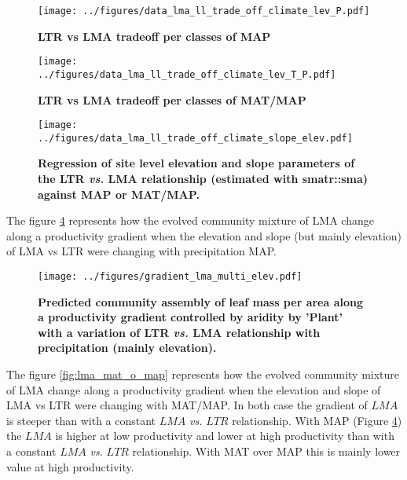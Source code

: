 \documentclass[a4paper,11pt]{article}
\begin{document}
\begin{figure}[ht]
\centering
\texttt{[image: ../figures/data\_lma\_ll\_trade\_off\_climate\_lev\_P.pdf]}
\caption{\textbf{LTR vs LMA tradeoff per classes of MAP}
\label{fig:MAP}}
\end{figure}


\begin{figure}[ht]
\centering
\texttt{[image: ../figures/data\_lma\_ll\_trade\_off\_climate\_lev\_T\_P.pdf]}
\caption{\textbf{LTR vs LMA tradeoff per classes of MAT/MAP}
\label{fig:MAT_MAP}}
\end{figure}


\begin{figure}[ht]
\centering
\texttt{[image: ../figures/data\_lma\_ll\_trade\_off\_climate\_slope\_elev.pdf]}
\caption{\textbf{Regression of site level elevation and slope parameters of the LTR \textit{vs.} LMA relationship (estimated with smatr::sma) against MAP or MAT/MAP. }
\label{fig:elev_slope}}
\end{figure}




The figure \ref{fig:lma_map} represents how the evolved community
mixture of LMA change along a productivity gradient when the elevation
and slope (but mainly elevation) of LMA vs LTR were changing with
precipitation MAP.

\begin{figure}[ht]
\centering
\texttt{[image: ../figures/gradient\_lma\_multi\_elev.pdf]}
\caption{\textbf{Predicted community assembly of leaf mass per area
    along a productivity gradient controlled by aridity by 'Plant'
    with a variation of LTR \textit{vs.} LMA relationship with precipitation (mainly elevation).}
\label{fig:lma_map}}
\end{figure}

The figure \ref{fig:lma_mat_o_map} represents how the evolved
community mixture of LMA change along a productivity gradient when the
elevation and slope of LMA vs LTR were changing with MAT/MAP. In both case the gradient of $LMA$ is steeper than
with a constant $LMA$ \textit{vs.} $LTR$ relationship. With MAP (Figure \ref{fig:lma_map}) the $LMA$ is
higher at low productivity and lower at high productivity than with a
constant $LMA$ \textit{vs.} $LTR$ relationship. With MAT over MAP this
is mainly lower value at high productivity.
\end{document}

